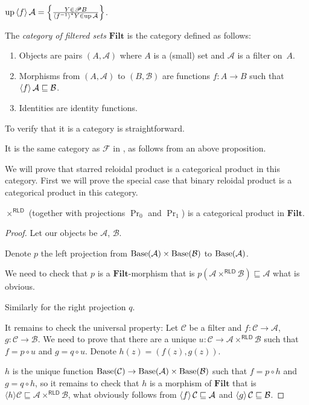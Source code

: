 \begin{cor}
$\operatorname{up}\left\langle f\right\rangle\mathcal{A} = \left\{ \frac{Y\in\mathscr{P} B}{\left\langle f^{-1}\right\rangle ^{\ast}Y\in\operatorname{up}\mathcal{A}}\right\}$.
\end{cor}

\begin{defn}
The \emph{category of filtered sets} $\mathbf{Filt}$ is the category defined as follows:
\begin{enumerate}
\item Objects are pairs $(A,\mathcal{A})$ where $A$ is a (small) set and $\mathcal{A}$ is a filter on~$A$.
\item Morphisms from $(A,\mathcal{A})$ to $(B,\mathcal{B})$ are functions $f:A\rightarrow B$ such that
$\left\langle f\right\rangle\mathcal{A} \sqsubseteq \mathcal{B}$.
\item Identities are identity functions.
\end{enumerate}
\end{defn}

To verify that it is a category is straightforward.

It is the same category as $\mathscr{F}$ in \cite{filt-cat}, as follows from an above proposition.

We will prove that starred reloidal product is a categorical product in this category.
First we will prove the special case that binary reloidal product is a categorical product in this category.

\begin{thm}
  $\times^{\mathsf{RLD}}$ (together with projections $\Pr_0$ and
  $\Pr_1$) is a categorical product in $\mathbf{Filt}$.
\end{thm}

\begin{proof}
  Let our objects be $\mathcal{A}$, $\mathcal{B}$.
  
  Denote $p$ the left projection from $\operatorname{Base} (\mathcal{A}) \times
  \operatorname{Base} (\mathcal{B})$ to $\operatorname{Base} (\mathcal{A})$.
  
  We need to check that $p$ is a $\mathbf{Filt}$-morphism that is $p
  (\mathcal{A} \times^{\mathsf{RLD}} \mathcal{B}) \sqsubseteq
  \mathcal{A}$ what is obvious.
  
  Similarly for the right projection $q$.
  
  It remains to check the universal property: Let $\mathcal{C}$ be a filter
  and $f : \mathcal{C} \rightarrow \mathcal{A}$, $g : \mathcal{C} \rightarrow
  \mathcal{B}$. We need to prove that there are a unique $u : \mathcal{C}
  \rightarrow \mathcal{A} \times^{\mathsf{RLD}} \mathcal{B}$ such that
  $f = p \circ u$ and $g = q \circ u$. Denote $h (z) = (f (z) , g (z))$.
  
  $h$ is the unique function $\operatorname{Base} (\mathcal{C}) \rightarrow
  \operatorname{Base} (\mathcal{A}) \times \operatorname{Base} (\mathcal{B})$ such that $f = p
  \circ h$ and $g = q \circ h$, so it remains to check that $h$ is a morphism
  of $\mathbf{Filt}$ that is $\langle h \rangle \mathcal{C}
  \sqsubseteq \mathcal{A} \times^{\mathsf{RLD}} \mathcal{B}$, what
  obviously follows from $\left\langle f\right\rangle \mathcal{C} \sqsubseteq
  \mathcal{A}$ and $\left\langle g\right\rangle \mathcal{C} \sqsubseteq \mathcal{B}$.
\end{proof}

